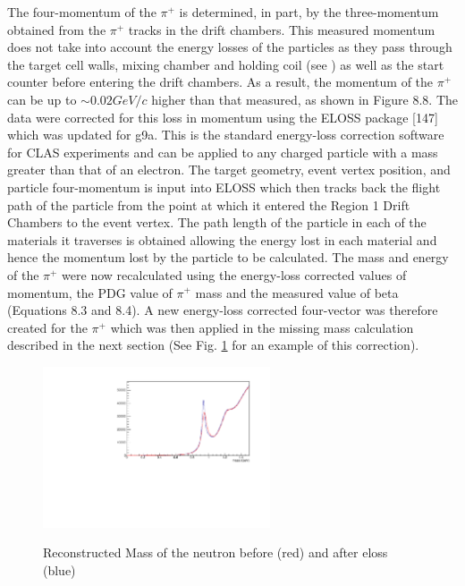 The four-momentum of the $\pi^+$ is determined, in part, by the three-momentum obtained from the $\pi^+$ tracks in the drift chambers. This measured momentum does not take into account the energy losses of the particles as they pass through the target cell walls, mixing chamber and holding coil (see \cite{Keith_2012}) as well as the start counter before entering the drift chambers. As a result, the momentum of the $\pi^+$ can be up to $\sim 0.02 GeV/c$ higher than that measured, as shown in Figure 8.8.
The data were corrected for this loss in momentum using the ELOSS package [147] which was updated for g9a. This is the standard energy-loss correction software for CLAS experiments and can be applied to any charged particle with a mass greater than that of an electron. The target geometry, event vertex position, and particle four-momentum is input into ELOSS which then tracks back the flight path of the particle from the point at which it entered the Region 1 Drift Chambers to the event vertex. The path length of the particle in each of the materials it traverses is obtained allowing the energy lost in each material and hence the momentum lost by the particle to be calculated. The mass and energy of the $\pi^+$ were now recalculated using the energy-loss corrected values of momentum, the PDG value of $\pi^+$ mass and the measured value of beta (Equations 8.3 and 8.4). A new energy-loss corrected four-vector was therefore created for the $\pi^+$ which was then applied in the missing mass calculation described in the next section (See Fig. \ref{fig:eloss_comp} for an example of this correction).
\begin{figure}[htb]
  \begin{center}
    \includegraphics[width=0.6\textwidth]{figures/eloss_comp.pdf} \\
    \caption{Reconstructed Mass of the neutron before (red) and after eloss (blue)}
    \label{fig:eloss_comp}
  \end{center}
\end{figure}



